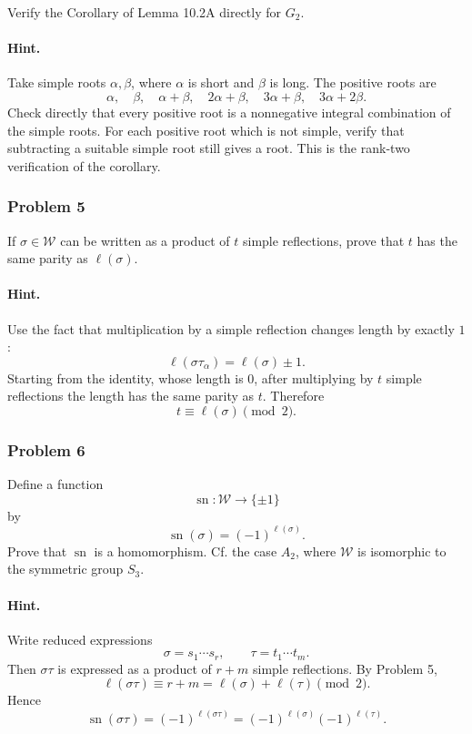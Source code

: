 \documentclass[12pt, a4paper]{article}
\begin{document}
Verify the Corollary of Lemma 10.2A directly for \(G_2\).

\paragraph{Hint.}
Take simple roots \(\alpha,\beta\), where \(\alpha\) is short and \(\beta\) is
long. The positive roots are
\[
\alpha,\quad \beta,\quad \alpha+\beta,\quad 2\alpha+\beta,\quad
3\alpha+\beta,\quad 3\alpha+2\beta.
\]
Check directly that every positive root is a nonnegative integral combination
of the simple roots. For each positive root which is not simple, verify that
subtracting a suitable simple root still gives a root. This is the rank-two
verification of the corollary.

\subsubsection{Problem 5}

If \(\sigma\in\mathcal W\) can be written as a product of \(t\) simple
reflections, prove that \(t\) has the same parity as \(\ell(\sigma)\).

\paragraph{Hint.}
Use the fact that multiplication by a simple reflection changes length by
exactly \(1\):
\[
\ell(\sigma\tau_\alpha)=\ell(\sigma)\pm 1.
\]
Starting from the identity, whose length is \(0\), after multiplying by \(t\)
simple reflections the length has the same parity as \(t\). Therefore
\[
t\equiv \ell(\sigma)\pmod 2.
\]

\subsubsection{Problem 6}

Define a function
\[
\operatorname{sn}:\mathcal W\to\{\pm 1\}
\]
by
\[
\operatorname{sn}(\sigma)=(-1)^{\ell(\sigma)}.
\]
Prove that \(\operatorname{sn}\) is a homomorphism. Cf. the case \(A_2\), where
\(\mathcal W\) is isomorphic to the symmetric group \(S_3\).

\paragraph{Hint.}
Write reduced expressions
\[
\sigma=s_1\cdots s_r,\qquad \tau=t_1\cdots t_m.
\]
Then \(\sigma\tau\) is expressed as a product of \(r+m\) simple reflections.
By Problem 5,
\[
\ell(\sigma\tau)\equiv r+m=\ell(\sigma)+\ell(\tau)\pmod 2.
\]
Hence
\[
\operatorname{sn}(\sigma\tau)
=
(-1)^{\ell(\sigma\tau)}
=
(-1)^{\ell(\sigma)}(-1)^{\ell(\tau)}.
\]
\end{document}
